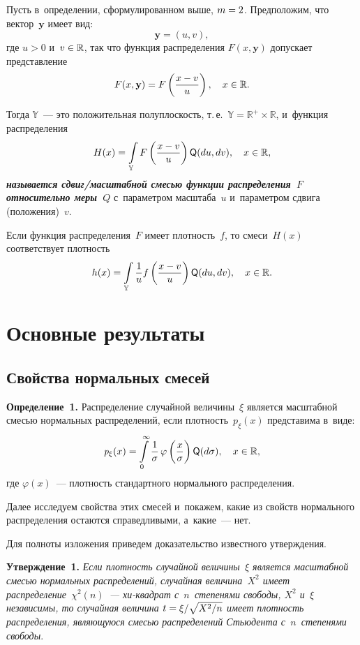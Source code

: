 \begin{multicols}{2}
Пусть в~определении, сформулированном выше, $m \hm= 2$. Предположим, что вектор~$\mathbf{y}$ имеет вид:
$$
\mathbf{y} = (u, v),
$$
где $u > 0$ и~$v \hm\in \mathbb{R}$, так что функция распределения $F (x,\textbf{y})$ 
допускает представление
$$
        F (x,\textbf{y}) = F \left(\displaystyle\frac{\displaystyle x-v\mathstrut}{\displaystyle u\mathstrut}\right), \quad  x \in \mathbb{R}.
$$

Тогда $\mathbb{Y}$~--- это положительная полуплоскость, т.\,е.\ $\mathbb{Y = R^+ \times R}$, 
и~функция распределения
$$
        H(x) = \int\limits_ \mathbb{Y} F\left(\displaystyle\frac{\displaystyle x-v\mathstrut}{\displaystyle u\mathstrut}\right) {\sf Q} (du, dv), \quad  x \in \mathbb{R},
$$
{\bfseries\textit{называется сдвиг/масштабной смесью функции распределения~$F$ относительно меры~$Q$}} 
с~параметром масштаба~$u$ и~параметром сдвига (положения)~$v$.

Если функция распределения~$F$ имеет плотность~$f$, то смеси~$H(x)$ соответствует плотность
$$
        h(x) = \int\limits_ \mathbb{Y} \displaystyle\frac{\displaystyle 1\mathstrut}{\displaystyle u\mathstrut} f\left(\displaystyle\frac{\displaystyle x-v\mathstrut}{\displaystyle u\mathstrut}\right) {\sf Q} (du, dv), \quad  x \in \mathbb{R}.
$$

\vspace*{-12pt}


\section{Основные результаты}

\subsection{Свойства нормальных смесей}

\noindent
\textbf{Определение~1.}
Распределение случайной величины~$\xi$ является масштабной смесью нормальных 
распределений, если плотность~$\mathit{p}_\xi(x)$ представима в~виде:
$$
\mathit{p}_\xi(x) = \int\limits_{0}^{\infty} \displaystyle\frac{\displaystyle 1\mathstrut}{\displaystyle \sigma\mathstrut} \, \varphi\left(\displaystyle\frac{\displaystyle x\mathstrut}{\displaystyle \sigma\mathstrut}\right) {\sf Q} (d\sigma), 
\quad x \in \mathbb{R},
$$
где $\varphi(x)$~--- плотность стандартного нормального распределения.

\smallskip

Далее исследуем свойства этих смесей и~покажем, какие из свойств 
нормального распределения остаются справедливыми, а~какие~--- нет.


Для полноты изложения приведем доказательство известного утверждения.

\smallskip

\noindent
\textbf{Утверждение~1.}
\textit{Если плотность случайной величины~$\xi$ является масштабной смесью нормальных распределений, 
случайная величина~$X^2$ имеет распределение~$\chi^2(n)$~--- хи-квад\-рат с~$n$~степенями свободы, 
$X^2$ и~$\xi$ независимы, то случайная величина $t \hm= {\xi}/{\sqrt{X^2/n}}$ 
имеет плотность распределения, являющуюся смесью распределений Стьюдента с~$n$~степенями свободы}.



\end{multicols}
